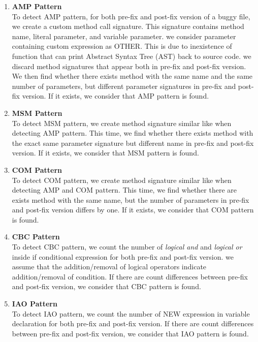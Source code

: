 \documentclass{sig-alternate-05-2015}
\begin{document}
\begin{enumerate}
\item {\bf AMP Pattern}\\
  To detect AMP pattern, for both pre-fix and post-fix version of a buggy file,
  we create a custom method call signature. This signature contains method name,
  literal parameter, and variable parameter. we consider parameter containing
  custom expression as OTHER. This is due to inexistence of function that can
  print Abstract Syntax Tree (AST) back to source code. we discard method
  signatures that appear both in pre-fix and post-fix version. We then find
  whether there exists method with the same name and the same number of
  parameters, but different parameter signatures in pre-fix and post-fix
  version. If it exists, we consider that AMP pattern is found.
	
\item {\bf MSM Pattern}\\
  To detect MSM pattern, we create method signature similar like when detecting
  AMP pattern. This time, we find whether there exists method with the exact
  same parameter signature but different name in pre-fix and post-fix
  version. If it exists, we consider that MSM pattern is found.
	
\item {\bf COM Pattern}\\
  To detect COM pattern, we create method signature similar like when detecting
  AMP and COM pattern. This time, we find whether there are exists method with
  the same name, but the number of parameters in pre-fix and post-fix version
  differs by one. If it exists, we consider that COM pattern is found.
	
\item {\bf CBC Pattern}\\
  To detect CBC pattern, we count the number of { \em logical and} and {\em
    logical or} inside if conditional expression for both pre-fix and post-fix
  version. we assume that the addition/removal of logical operators indicate
  addition/removal of condition. If there are count differences between pre-fix
  and post-fix version, we consider that CBC pattern is found.
	
\item {\bf IAO Pattern}\\
  To detect IAO pattern, we count the number of NEW expression in variable
  declaration for both pre-fix and post-fix version. If there are count
  differences between pre-fix and post-fix version, we consider that IAO pattern
  is found.
	

\end{enumerate}
\end{document}
